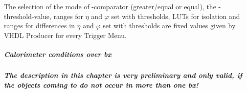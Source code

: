 The selection of the mode of \et-comparator (greater/equal or equal), the \et-threshold-value, ranges for $\eta$ and $\varphi$ set with thresholds, LUTs for isolation and
ranges for differences in $\eta$ and $\varphi$ set with thresholds are fixed values given by VHDL Producer for every Trigger Menu.

\subparagraph{Calorimeter conditions over bx}\label{sec:gtl:calo_cond_over_bx}

\textbf{\textit{The description in this chapter is very preliminary and only valid, if the objects coming to \ugt do not occur in more than one bx!}}

